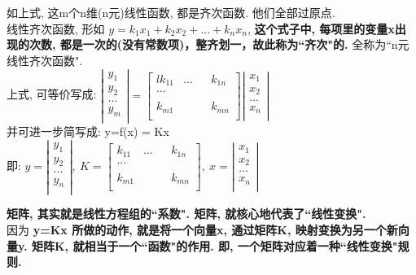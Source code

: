\documentclass[UTF8]{ctexart}
\begin{document}
如上式, 这m个n维(n元)线性函数, 都是齐次函数. 他们全部过原点. \\
线性齐次函数, 形如 $	y=k_{1}x_1+k_{2}x_2+...+k_{n}x_n$, \textbf{这个式子中, 每项里的变量x出现的次数, 都是一次的(没有常数项)，整齐划一，故此称为``齐次"的.} 全称为``n元线性齐次函数". \\

上式, 可等价写成: 
$
\left| \begin{array}{l}
	y_1\\
	y_2\\
	...\\
	y_m\\
\end{array} \right|=\left[ \begin{matrix}{l}
	k_{11}&		...&		&		k_{1n}\\
	...&		&		&		\\
	&		&		&		\\
	k_{m1}&		&		&		k_{mn}\\
\end{matrix} \right] \left| \begin{array}{l}
	x_1\\
	x_2\\
	...\\
	x_n\\
\end{array} \right|
$ \\

并可进一步简写成: y=f(x) = Kx \\
即:
$
y=\left| \begin{array}{l}
	y_1\\
	y_2\\
	...\\
	y_n\\
\end{array} \right|,\ K=\left[ \begin{matrix}
	k_{11}&		...&		&		k_{1n}\\
	...&		&		&		\\
	&		&		&		\\
	k_{m1}&		&		&		k_{mn}\\
\end{matrix} \right] ,\ x=\left| \begin{array}{l}
	x_1\\
	x_2\\
	...\\
	x_n\\
\end{array} \right|
$\\
\vspace{1em} 

\textbf{矩阵, 其实就是线性方程组的``系数". 矩阵, 就核心地代表了``线性变换".}\\
因为 \textbf{y=Kx 所做的动作, 就是将一个向量x, 通过矩阵K, 映射变换为另一个新向量y. 矩阵K, 就相当于一个``函数"的作用. 即, 一个矩阵对应着一种``线性变换"规则.} \\
\end{document}
